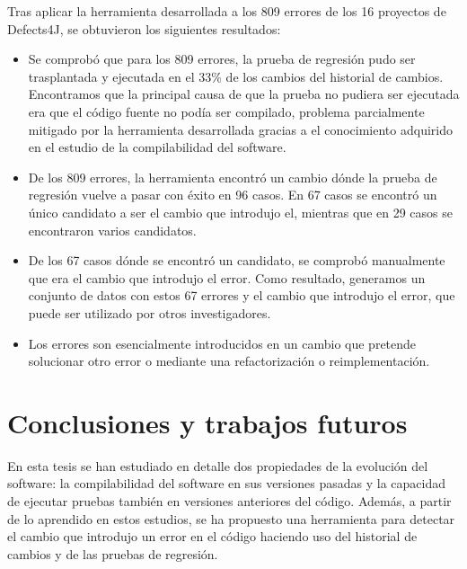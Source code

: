 Tras aplicar la herramienta desarrollada a los 809 errores de los 16 proyectos de Defects4J, se obtuvieron los siguientes resultados:

\begin{itemize}
    \item Se comprobó que para los 809 errores, la prueba de regresión pudo ser trasplantada y ejecutada en el 33\% de los cambios del historial de cambios.
    Encontramos que la principal causa de que la prueba no pudiera ser ejecutada era que el código fuente no podía ser compilado, problema parcialmente mitigado por la herramienta desarrollada gracias a el conocimiento adquirido en el estudio de la compilabilidad del software.
    \item De los 809 errores, la herramienta encontró un cambio dónde la prueba de regresión vuelve a pasar con éxito en 96 casos. En 67 casos se encontró un único candidato a ser el cambio que introdujo el, mientras que en 29 casos se encontraron varios candidatos.
    \item De los 67 casos dónde se encontró un candidato, se comprobó manualmente que era el cambio que introdujo el error. 
    Como resultado, generamos un conjunto de datos con estos 67 errores y el cambio que introdujo el error, que puede ser utilizado por otros investigadores.
    \item Los errores son esencialmente introducidos en un cambio que pretende solucionar otro error o mediante una refactorización o reimplementación.
\end{itemize}

\section{Conclusiones y trabajos futuros}
\label{sec:resumen:conclusiones}

En esta tesis se han estudiado en detalle dos propiedades de la evolución del software: la compilabilidad del software en sus versiones pasadas y la capacidad de ejecutar pruebas también en versiones anteriores del código. 
Además, a partir de lo aprendido en estos estudios, se ha propuesto una herramienta para detectar el cambio que introdujo un error en el código haciendo uso del historial de cambios y de las pruebas de regresión. 

